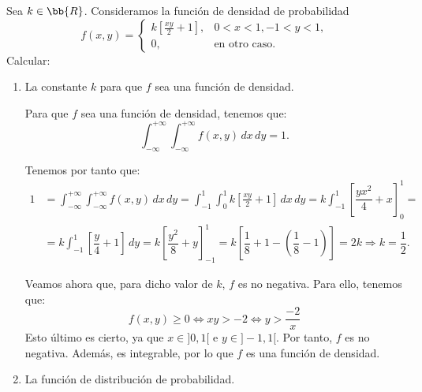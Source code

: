 \begin{ejercicio}
    Sea $k\in \bb{R}$. Consideramos la función de densidad de probabilidad
    \[
        f(x, y) = \begin{cases}
            k\left[\frac{xy}{2}+1\right], & 0 < x < 1, -1 < y < 1, \\
            0, & \text{en otro caso}.
        \end{cases}
    \]
    Calcular:
    \begin{enumerate}
        \item La constante $k$ para que $f$ sea una función de densidad.
        
        Para que $f$ sea una función de densidad, tenemos que:
        \begin{equation*}
            \int_{-\infty}^{+\infty} \int_{-\infty}^{+\infty} f(x, y) \, dx \, dy = 1.
        \end{equation*}

        Tenemos por tanto que:
        \begin{align*}
            1&=\int_{-\infty}^{+\infty} \int_{-\infty}^{+\infty} f(x, y) \, dx \, dy
            = \int_{-1}^{1} \int_{0}^{1} k\left[\frac{xy}{2}+1\right] \, dx \, dy = k\int_{-1}^{1} \left[\dfrac{yx^2}{4}+x\right]_0^1
            =\\&= k\int_{-1}^{1} \left[\dfrac{y}{4}+1\right] \, dy = k\left[\dfrac{y^2}{8}+y\right]_{-1}^1 = k\left[\dfrac{1}{8}+1-\left(\dfrac{1}{8}-1\right)\right] = 2k \Longrightarrow k = \dfrac{1}{2}.
        \end{align*}

        Veamos ahora que, para dicho valor de $k$, $f$ es no negativa. Para ello, tenemos que:
        \begin{equation*}
            f(x, y) \geq 0 \Longleftrightarrow xy>-2 \Longleftrightarrow y>\dfrac{-2}{x}
        \end{equation*}
        Esto último es cierto, ya que $x\in ]0,1[$ e $y\in ]-1,1[$. Por tanto, $f$ es no negativa. Además, es integrable, por lo que $f$ es una función de densidad.

        \item La función de distribución de probabilidad.
        

\end{enumerate}
\end{ejercicio}
